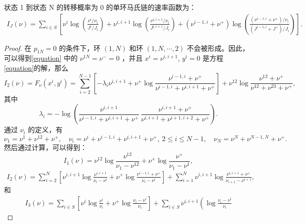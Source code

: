 \begin{proposition}
	状态 1 到状态 N 的转移概率为 0 的单环马氏链的速率函数为：
	\begin{equation*}
		\begin{split}
			I_J(\nu) = \sum_{i\in S}\left[\nu^i\log\left(\frac{\nu^i/\nu_i}{J^i/J_i}\right)
			+\nu^{i,i+1}\log\left(\frac{\nu^{i,i+1}/\nu_i}{J^{i,i+1}/J_i}\right)+\left(\nu^{i-1,i}+\nu^+\right)\log\left(\frac{\left(\nu^{i-1,i}+\nu^+\right)/\nu_i}
			{\left(J^{i-1,i}+J^+\right)/J_i}\right)\right].
		\end{split}
	\end{equation*}
\end{proposition}
\begin{proof}
	在 $p_{1N}=0$ 的条件下，环 $(1,N)$ 和环 $(1,N,\cdots,2)$ 不会被形成。因此，可以得到\eqref{equation} 中的 $\nu^{1N}=\nu^{-}=0$ ，并且 $x^{i}=\nu^{i,i+1}$, $y^{i}=0$ 是方程 \eqref{equation}的解，那么
	\begin{equation*}
		I_2(\nu)=F_{\nu}(x^i,y^i)=\sum_{i=2}^{N-1}\left[-\lambda_{i}\nu^{i,i+1}+\nu^+\log\frac{\nu^{i-1,i}+\nu^+}{\nu^{i-1,i}+\nu^{i,i+1}+\nu^+}\right]+\nu^{12}\log\frac{\nu^{12}+\nu^+}{\nu^{12}+\nu^{23}+\nu^+},
	\end{equation*}
	其中 
	\begin{equation*}
		\lambda_i=-\log\left(\frac{\nu^{i,i+1}}{\nu^{i-1,i}+\nu^{i,i+1}+\nu^+}\,\frac{\nu^{i,i+1}+\nu^+}{\nu^{i,i+1}+\nu^{i+1,i+2}+\nu^+}\right).
	\end{equation*}
	通过 $\nu_i$ 的定义，有
	\begin{equation*}
		\nu_1=\nu^{1}+\nu^{12}+\nu^+,\quad \nu_i=\nu^i+\nu^{i-1,i}+\nu^{i,i+1}+\nu^+,\ 2\le i\le N-1,\quad \nu_N=\nu^N+\nu^{N-1,N}+\nu^+.
	\end{equation*} 
然后通过计算，可以得到：	
\begin{equation}\label{I1lack}
	I_1(\nu)=\nu^{12}\log\frac{\nu^{12}}{\nu_1-\nu^{12}}+\nu^+\log\frac{\nu^+}{\nu_1-\nu^1},
\end{equation}
	\begin{align}\label{I2lack}
	I_2(\nu)
	=\sum_{i=2}^{N}\left[\nu^{i,i+1}\log\frac{\nu^{i,i+1}}{\nu_i-\nu^i}+\nu^+\log\frac{\nu^{i-1,i}+\nu^+}{\nu_i-\nu^i}\right]+\sum_{i=1}^{N}\nu^{i,i+1}\log\frac{\nu^{i,i+1}+\nu^+}{\nu_{i+1}-\nu^{i+1}},
   \end{align}
和
	\begin{equation}\label{I3lack}
		\begin{split}
			I_3(\nu)=\sum_{i\in S}\left[\nu^i\log\frac{\nu^i}{\nu_i}+\nu^+\log\frac{\nu_i-\nu^i}{\nu_i}\right]+\sum_{i\in S}\nu^{i,i+1}\left(\log\frac{\nu_i-\nu^i}{\nu_i}

\end{split}
\end{equation}
\end{proof}
